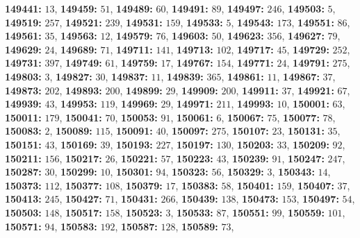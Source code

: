 \textsf{\bfseries 149441:} $13$, \textsf{\bfseries 149459:} $51$, \textsf{\bfseries 149489:} $60$, \textsf{\bfseries 149491:} $89$, \textsf{\bfseries 149497:} $246$, \textsf{\bfseries 149503:} $5$, \textsf{\bfseries 149519:} $257$, \textsf{\bfseries 149521:} $239$, \textsf{\bfseries 149531:} $159$, \textsf{\bfseries 149533:} $5$, \textsf{\bfseries 149543:} $173$, \textsf{\bfseries 149551:} $86$, \textsf{\bfseries 149561:} $35$, \textsf{\bfseries 149563:} $12$, \textsf{\bfseries 149579:} $76$, \textsf{\bfseries 149603:} $50$, \textsf{\bfseries 149623:} $356$, \textsf{\bfseries 149627:} $79$, \textsf{\bfseries 149629:} $24$, \textsf{\bfseries 149689:} $71$, \textsf{\bfseries 149711:} $141$, \textsf{\bfseries 149713:} $102$, \textsf{\bfseries 149717:} $45$, \textsf{\bfseries 149729:} $252$, \textsf{\bfseries 149731:} $397$, \textsf{\bfseries 149749:} $61$, \textsf{\bfseries 149759:} $17$, \textsf{\bfseries 149767:} $154$, \textsf{\bfseries 149771:} $24$, \textsf{\bfseries 149791:} $275$, \textsf{\bfseries 149803:} $3$, \textsf{\bfseries 149827:} $30$, \textsf{\bfseries 149837:} $11$, \textsf{\bfseries 149839:} $365$, \textsf{\bfseries 149861:} $11$, \textsf{\bfseries 149867:} $37$, \textsf{\bfseries 149873:} $202$, \textsf{\bfseries 149893:} $200$, \textsf{\bfseries 149899:} $29$, \textsf{\bfseries 149909:} $200$, \textsf{\bfseries 149911:} $37$, \textsf{\bfseries 149921:} $67$, \textsf{\bfseries 149939:} $43$, \textsf{\bfseries 149953:} $119$, \textsf{\bfseries 149969:} $29$, \textsf{\bfseries 149971:} $211$, \textsf{\bfseries 149993:} $10$, \textsf{\bfseries 150001:} $63$, \textsf{\bfseries 150011:} $179$, \textsf{\bfseries 150041:} $70$, \textsf{\bfseries 150053:} $91$, \textsf{\bfseries 150061:} $6$, \textsf{\bfseries 150067:} $75$, \textsf{\bfseries 150077:} $78$, \textsf{\bfseries 150083:} $2$, \textsf{\bfseries 150089:} $115$, \textsf{\bfseries 150091:} $40$, \textsf{\bfseries 150097:} $275$, \textsf{\bfseries 150107:} $23$, \textsf{\bfseries 150131:} $35$, \textsf{\bfseries 150151:} $43$, \textsf{\bfseries 150169:} $39$, \textsf{\bfseries 150193:} $227$, \textsf{\bfseries 150197:} $130$, \textsf{\bfseries 150203:} $33$, \textsf{\bfseries 150209:} $92$, \textsf{\bfseries 150211:} $156$, \textsf{\bfseries 150217:} $26$, \textsf{\bfseries 150221:} $57$, \textsf{\bfseries 150223:} $43$, \textsf{\bfseries 150239:} $91$, \textsf{\bfseries 150247:} $247$, \textsf{\bfseries 150287:} $30$, \textsf{\bfseries 150299:} $10$, \textsf{\bfseries 150301:} $94$, \textsf{\bfseries 150323:} $56$, \textsf{\bfseries 150329:} $3$, \textsf{\bfseries 150343:} $14$, \textsf{\bfseries 150373:} $112$, \textsf{\bfseries 150377:} $108$, \textsf{\bfseries 150379:} $17$, \textsf{\bfseries 150383:} $58$, \textsf{\bfseries 150401:} $159$, \textsf{\bfseries 150407:} $37$, \textsf{\bfseries 150413:} $245$, \textsf{\bfseries 150427:} $71$, \textsf{\bfseries 150431:} $266$, \textsf{\bfseries 150439:} $138$, \textsf{\bfseries 150473:} $153$, \textsf{\bfseries 150497:} $54$, \textsf{\bfseries 150503:} $148$, \textsf{\bfseries 150517:} $158$, \textsf{\bfseries 150523:} $3$, \textsf{\bfseries 150533:} $87$, \textsf{\bfseries 150551:} $99$, \textsf{\bfseries 150559:} $101$, \textsf{\bfseries 150571:} $94$, \textsf{\bfseries 150583:} $192$, \textsf{\bfseries 150587:} $128$, \textsf{\bfseries 150589:} $73$, 
